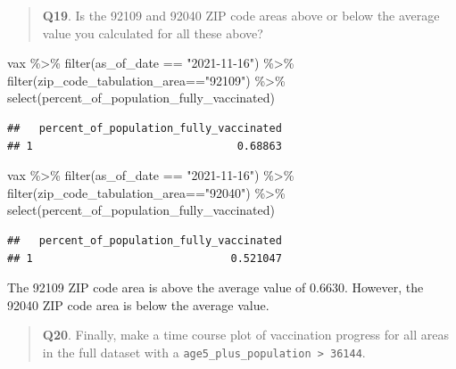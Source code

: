 \documentclass[
]{article}
\newenvironment{Shaded}{\begin{snugshade}}{\end{snugshade}}
\newcommand{\FunctionTok}[1]{\textcolor[rgb]{0.00,0.00,0.00}{#1}}
\newcommand{\NormalTok}[1]{#1}
\newcommand{\SpecialCharTok}[1]{\textcolor[rgb]{0.00,0.00,0.00}{#1}}
\newcommand{\StringTok}[1]{\textcolor[rgb]{0.31,0.60,0.02}{#1}}
\begin{document}
\begin{quote}
\textbf{Q19}. Is the 92109 and 92040 ZIP code areas above or below the
average value you calculated for all these above?
\end{quote}

\begin{Shaded}
\begin{Highlighting}[]
\NormalTok{vax }\SpecialCharTok{\%\textgreater{}\%} \FunctionTok{filter}\NormalTok{(as\_of\_date }\SpecialCharTok{==} \StringTok{"2021{-}11{-}16"}\NormalTok{) }\SpecialCharTok{\%\textgreater{}\%}  
  \FunctionTok{filter}\NormalTok{(zip\_code\_tabulation\_area}\SpecialCharTok{==}\StringTok{"92109"}\NormalTok{) }\SpecialCharTok{\%\textgreater{}\%}
  \FunctionTok{select}\NormalTok{(percent\_of\_population\_fully\_vaccinated)}
\end{Highlighting}
\end{Shaded}

\begin{verbatim}
##   percent_of_population_fully_vaccinated
## 1                                0.68863
\end{verbatim}

\begin{Shaded}
\begin{Highlighting}[]
\NormalTok{vax }\SpecialCharTok{\%\textgreater{}\%} \FunctionTok{filter}\NormalTok{(as\_of\_date }\SpecialCharTok{==} \StringTok{"2021{-}11{-}16"}\NormalTok{) }\SpecialCharTok{\%\textgreater{}\%}  
  \FunctionTok{filter}\NormalTok{(zip\_code\_tabulation\_area}\SpecialCharTok{==}\StringTok{"92040"}\NormalTok{) }\SpecialCharTok{\%\textgreater{}\%}
  \FunctionTok{select}\NormalTok{(percent\_of\_population\_fully\_vaccinated)}
\end{Highlighting}
\end{Shaded}

\begin{verbatim}
##   percent_of_population_fully_vaccinated
## 1                               0.521047
\end{verbatim}

The 92109 ZIP code area is above the average value of 0.6630. However,
the 92040 ZIP code area is below the average value.

\begin{quote}
\textbf{Q20}. Finally, make a time course plot of vaccination progress
for all areas in the full dataset with a
\texttt{age5\_plus\_population\ \textgreater{}\ 36144}.
\end{quote}
\end{document}
